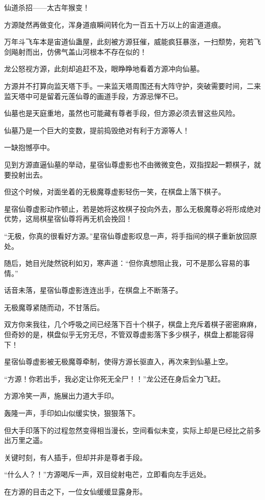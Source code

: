 \begin{this_body}
仙道杀招——太古年猴变！

方源陡然再做变化，浑身道痕瞬间转化为一百五十万以上的宙道道痕。

万年斗飞车本是宙道仙蛊屋，此刻被方源狂催，威能疯狂暴涨，一扫颓势，宛若飞剑飚射而出，仿佛气盖山河根本不存在似的！

龙公怒视方源，此刻却追赶不及，眼睁睁地看着方源冲向仙墓。

方源并不打算向监天塔下手。一来监天塔周围还有大阵守护，突破需要时间，二来监天塔中可是留着元莲仙尊的画道手段，方源忌惮不已。

仙墓也是天庭重地，虽然也可能藏有尊者手段，但方源必须去冒这些风险。

仙墓乃是一个巨大的变数，提前捣毁绝对有利于方源等人！

一缺抱憾亭中。

见到方源直逼仙墓的举动，星宿仙尊虚影也不由微微变色，双指捏起一颗棋子，就要投射出去。

但这个时候，对面坐着的无极魔尊虚影轻伤一笑，在棋盘上落下棋子。

星宿仙尊虚影动作顿止，若是她将这枚棋子投向外去，那么无极魔尊必将形成绝对优势，这局棋星宿仙尊将再无机会挽回！

“无极，你真的很看好方源。”星宿仙尊虚影叹息一声，将手指间的棋子重新放回原处。

随后，她目光陡然锐利如刃，寒声道：“但你真想阻止我，可不是那么容易的事情。”

话音未落，星宿仙尊虚影连连出手，在棋盘上不断落子。

无极魔尊紧随而动，不甘落后。

双方你来我往，几个呼吸之间已经落下百十个棋子，棋盘上充斥着棋子密密麻麻，但奇妙的是，棋盘似乎无穷无尽，不管双尊虚影落下多少棋子，棋盘上都能容得下！

星宿仙尊虚影被无极魔尊牵制，使得方源长驱直入，再次来到仙墓上空。

“方源！你若出手，我必定让你死无全尸！！”龙公还在身后全力飞赶。

方源冷笑一声，施展出力道大手印。

轰隆一声，手印如山似缓实快，狠狠落下。

但大手印落下的过程忽然变得相当漫长，空间看似未变，实际上却是已经比之前多出万里之遥。

关键时刻，有人插手，但却并非是尊者手段。

“什么人？！”方源喝斥一声，双目绽射电芒，立即看向左手远处。

在方源的目击之下，一位女仙缓缓显露身形。


\end{this_body}
